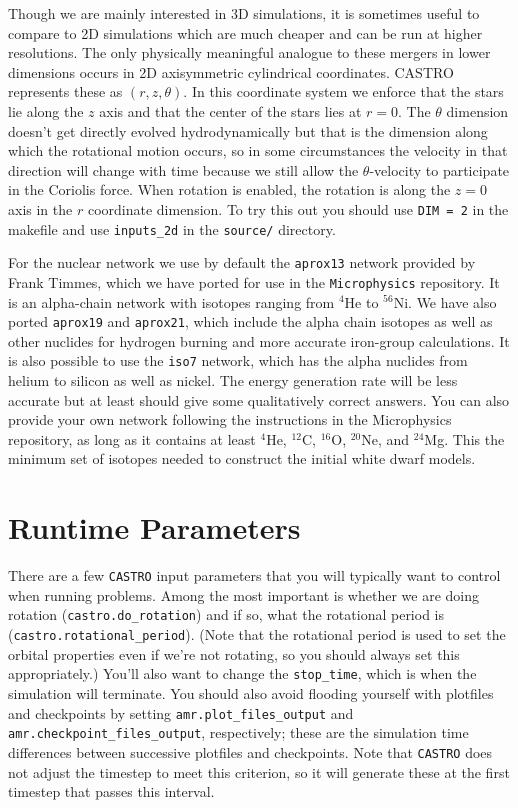 \documentclass[12pt]{book}
\begin{document}
Though we are mainly interested in 3D simulations, it is sometimes useful to compare to 2D
simulations which are much cheaper and can be run at higher resolutions. The only physically
meaningful analogue to these mergers in lower dimensions occurs in 2D axisymmetric cylindrical
coordinates. CASTRO represents these as $(r,z,\theta)$. In this coordinate system we enforce
that the stars lie along the $z$ axis and that the center of the stars lies at $r = 0$. The
$\theta$ dimension doesn't get directly evolved hydrodynamically but that is the dimension
along which the rotational motion occurs, so in some circumstances the velocity in that
direction will change with time because we still allow the $\theta$-velocity to participate in
the Coriolis force. When rotation is enabled, the rotation is along the $z = 0$ axis in the $r$
coordinate dimension. To try this out you should use \texttt{DIM = 2} in the makefile and
use \texttt{inputs\_2d} in the \texttt{source/} directory.

For the nuclear network we use by default the \texttt{aprox13} network provided by Frank Timmes, which 
we have ported for use in the \texttt{Microphysics} repository. It is an alpha-chain network 
with isotopes ranging from ${}^4$He to ${}^{56}$Ni. We have also ported \texttt{aprox19} and
\texttt{aprox21}, which include the alpha chain isotopes as well as other nuclides for hydrogen
burning and more accurate iron-group calculations. It is also possible to use the \texttt{iso7}
network, which has the alpha nuclides from helium to silicon as well as nickel. The energy generation
rate will be less accurate but at least should give some qualitatively correct answers. You can also
provide your own network following the instructions in the Microphysics repository, as long as it
contains at least ${}^4$He, ${}^{12}$C, ${}^{16}$O, ${}^{20}$Ne, and ${}^{24}$Mg. This the minimum
set of isotopes needed to construct the initial white dwarf models.

\section{Runtime Parameters}

There are a few \texttt{CASTRO} input parameters that you will typically want to control when running problems. 
Among the most important is whether we are doing rotation (\texttt{castro.do\_rotation}) and if so, 
what the rotational period is (\texttt{castro.rotational\_period}). (Note that the rotational period 
is used to set the orbital properties even if we're not rotating, so you should always set this appropriately.)
You'll also want to change the \texttt{stop\_time}, which is when the simulation will terminate. 
You should also avoid flooding yourself with plotfiles and checkpoints by setting \texttt{amr.plot\_files\_output} and 
\texttt{amr.checkpoint\_files\_output}, respectively; these are the simulation time differences
between successive plotfiles and checkpoints. Note that \texttt{CASTRO} does not adjust the timestep 
to meet this criterion, so it will generate these at the first timestep that passes this interval.
\end{document}
